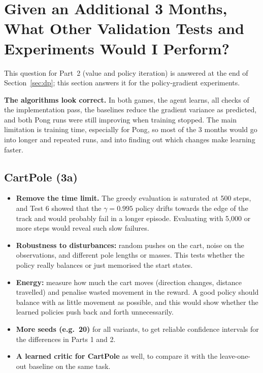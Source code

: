 \section{Given an Additional 3 Months, What Other Validation Tests and Experiments Would I Perform?}
\label{sec:outlook}

This question for Part~2 (value and policy iteration) is answered at the end of Section~\ref{sec:dp}; this section answers it for the policy-gradient experiments.

\textbf{The algorithms look correct.} In both games, the agent learns, all checks of the implementation pass, the baselines reduce the gradient variance as predicted, and both Pong runs were still improving when training stopped. The main limitation is training time, especially for Pong, so most of the 3 months would go into longer and repeated runs, and into finding out which changes make learning faster.

\subsection{CartPole (3a)}

\begin{itemize}
  \item \textbf{Remove the time limit.} The greedy evaluation is saturated at 500 steps, and Test 6 showed that the $\gamma = 0.995$ policy drifts towards the edge of the track and would probably fail in a longer episode. Evaluating with 5,000 or more steps would reveal such slow failures.
  \item \textbf{Robustness to disturbances:} random pushes on the cart, noise on the observations, and different pole lengths or masses. This tests whether the policy really balances or just memorised the start states.
  \item \textbf{Energy:} measure how much the cart moves (direction changes, distance travelled) and penalise wasted movement in the reward. A good policy should balance with as little movement as possible, and this would show whether the learned policies push back and forth unnecessarily.
  \item \textbf{More seeds (e.g.\ 20)} for all variants, to get reliable confidence intervals for the differences in Parts 1 and 2.
  \item \textbf{A learned critic for CartPole} as well, to compare it with the leave-one-out baseline on the same task.
\end{itemize}

